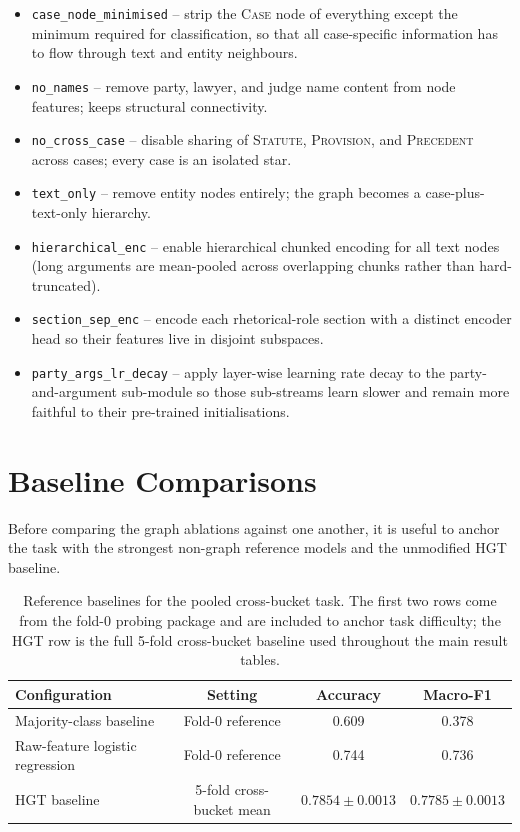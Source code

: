 \begin{itemize}
  \item \texttt{case\_node\_minimised} -- strip the \textsc{Case}
    node of everything except the minimum required for classification,
    so that all case-specific information has to flow through text
    and entity neighbours.
  \item \texttt{no\_names} -- remove party, lawyer, and judge name
    content from node features; keeps structural connectivity.
  \item \texttt{no\_cross\_case} -- disable sharing of \textsc{Statute},
    \textsc{Provision}, and \textsc{Precedent} across cases; every
    case is an isolated star.
  \item \texttt{text\_only} -- remove entity nodes entirely; the
    graph becomes a case-plus-text-only hierarchy.
  \item \texttt{hierarchical\_enc} -- enable hierarchical chunked
    encoding for all text nodes (long arguments are mean-pooled across
    overlapping chunks rather than hard-truncated).
  \item \texttt{section\_sep\_enc} -- encode each rhetorical-role
    section with a distinct encoder head so their features live in
    disjoint subspaces.
  \item \texttt{party\_args\_lr\_decay} -- apply layer-wise learning
    rate decay to the party-and-argument sub-module so those
    sub-streams learn slower and remain more faithful to their
    pre-trained initialisations.
\end{itemize}

\section{Baseline Comparisons}

Before comparing the graph ablations against one another, it is useful
to anchor the task with the strongest non-graph reference models and
the unmodified HGT baseline.

{\color{blue}
\begin{table}[H]
  \centering
  \small
  \begin{tabular}{lccc}
    \toprule
    Configuration & Setting & Accuracy & Macro-F1 \\
    \midrule
    Majority-class baseline & Fold-0 reference & 0.609 & 0.378 \\
    Raw-feature logistic regression & Fold-0 reference & 0.744 & 0.736 \\
    HGT baseline & 5-fold cross-bucket mean & $0.7854\pm0.0013$ & $0.7785\pm0.0013$ \\
    \bottomrule
  \end{tabular}
  \caption{{\color{blue}Reference baselines for the pooled
  cross-bucket task. The first two rows come from the fold-0 probing
  package and are included to anchor task difficulty; the HGT row is
  the full 5-fold cross-bucket baseline used throughout the main result
  tables.}}
  \label{tab:baseline_references}
\end{table}
}

